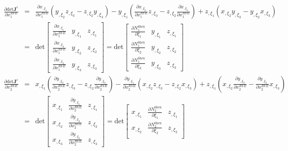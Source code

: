 \begin{eqnarray}
\frac{\partial \text{det}\pmb{J}^e}{\partial x_1^{RVE}} &=& \frac{\partial x_{,\xi_1}}{\partial x_1^{RVE}}\left(y_{,\xi_2}z_{,\xi_3} - z_{,\xi_2}y_{,\xi_3} \right) - y_{,\xi_1}\left(\frac{\partial x_{,\xi_2}}{\partial x_1^{RVE}}z_{,\xi_3}-z_{,\xi_2}\frac{\partial x_{,\xi_3}}{\partial x_1^{RVE}} \right) + z_{,\xi_1}\left(x_{,\xi_2}y_{,\xi_3}-y_{,\xi_2}x_{,\xi_3} \right) \nonumber\\
%
&=& \text{det} \begin{bmatrix}
\frac{\partial x_{,\xi_1}}{\partial x_1^{RVE}} & y_{,\xi_1} & z_{,\xi_1} \\
\frac{\partial x_{,\xi_2}}{\partial x_1^{RVE}} & y_{,\xi_2} & z_{,\xi_2} \\
\frac{\partial x_{,\xi_3}}{\partial x_1^{RVE}} & y_{,\xi_3} & z_{,\xi_3}
\end{bmatrix} 
%
= \text{det} \begin{bmatrix}
\frac{\partial N_1^{6\text{hex}}}{\partial \xi_1} & y_{,\xi_1} & z_{,\xi_1} \\
\frac{\partial N_1^{6\text{hex}}}{\partial \xi_2} & y_{,\xi_2} & z_{,\xi_2} \\
\frac{\partial N_1^{6\text{hex}}}{\partial \xi_3} & y_{,\xi_3} & z_{,\xi_3}
\end{bmatrix} \nonumber\\
\frac{\partial \text{det}\pmb{J}^e}{\partial x_2^{RVE}} &=& x_{,\xi_1}\left(\frac{\partial y_{,\xi_2}}{\partial x_2^{RVE}}z_{,\xi_3} - z_{,\xi_2}\frac{\partial y_{,\xi_3}}{\partial x_2^{RVE}} \right) - \frac{\partial y_{,\xi_1}}{\partial x_2^{RVE}}\left(x_{,\xi_2}z_{,\xi_3}-z_{,\xi_2}x_{,\xi_3} \right) + z_{,\xi_1}\left(x_{,\xi_2}\frac{\partial y_{,\xi_3}}{\partial x_2^{RVE}}-\frac{\partial y_{,\xi_2}}{\partial x_2^{RVE}}x_{,\xi_3} \right) \nonumber\\
%
&=& \text{det} \begin{bmatrix}
x_{,\xi_1} & \frac{\partial y_{,\xi_1}}{\partial x_2^{RVE}} & z_{,\xi_1} \\
x_{,\xi_2} & \frac{\partial y_{,\xi_2}}{\partial x_2^{RVE}} & z_{,\xi_2} \\
x_{,\xi_3} & \frac{\partial y_{,\xi_3}}{\partial x_2^{RVE}} & z_{,\xi_3}
\end{bmatrix} 
%
= \text{det} \begin{bmatrix}
x_{,\xi_1} & \frac{\partial N_2^{6\text{hex}}}{\partial \xi_1} & z_{,\xi_1} \\
x_{,\xi_2} & \frac{\partial N_2^{6\text{hex}}}{\partial \xi_2} & z_{,\xi_2} \\

\end{bmatrix}
\end{eqnarray}
